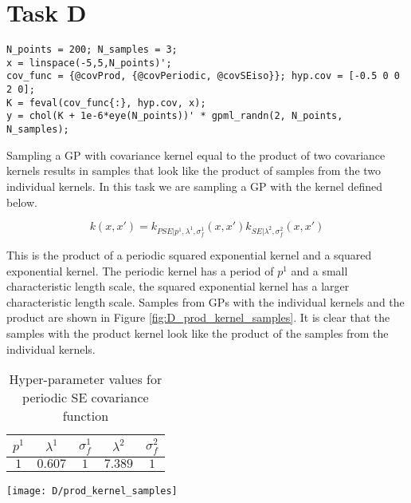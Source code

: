 \documentclass[11pt, twocolumn]{article}
\begin{document}
\section{Task D}

\begin{figure*}[h]
\begin{lstlisting}[caption=Code to sample a GP with covariance defined by the product of a periodic SE kernel and a SE kernel, captionpos=b, basicstyle=\small, frame=tlrb]
N_points = 200; N_samples = 3;
x = linspace(-5,5,N_points)';
cov_func = {@covProd, {@covPeriodic, @covSEiso}}; hyp.cov = [-0.5 0 0 2 0];
K = feval(cov_func{:}, hyp.cov, x);
y = chol(K + 1e-6*eye(N_points))' * gpml_randn(2, N_points, N_samples);
\end{lstlisting}
\label{lst:2D}
\end{figure*}

Sampling a GP with covariance kernel equal to the product of two covariance kernels results in samples that look like the product of samples from the two individual kernels. In this task we are sampling a GP with the kernel defined below.

\[k(x, x') = k_{PSE | p^1, \lambda^1, \sigma_f^1}(x, x')k_{SE | \lambda^2, \sigma_f^2}(x, x')\]

This is the product of a periodic squared exponential kernel and a squared exponential kernel. The periodic kernel has a period of $p^1$ and a small characteristic length scale, the squared exponential kernel has a larger characteristic length scale. Samples from GPs with the individual kernels and the product are shown in Figure \ref{fig:D_prod_kernel_samples}. It is clear that the samples with the product kernel look like the product of the samples from the individual kernels.

\begin{table}[h]
    \centering
    \small
    \begin{tabular}{|c|c|c|c|c|}
        \hline
        $p^1$ & $\lambda^1$ & $\sigma_f^1$ & $\lambda^2$ & $\sigma_f^2$ \\
        \hline
        $1$ & $0.607$ & $1$ & $7.389$ & $1$ \\
        \hline
    \end{tabular}
    \caption{Hyper-parameter values for periodic SE covariance function}
    \label{table:D_product_covariance_hyper_parameters}
\end{table}

\begin{figure*}[h]
    \centering
    \texttt{[image: D/prod\_kernel\_samples]}
    \caption{Samples from 3 covariance kernels, hyper-parameters for each given in Table \ref{table:D_product_covariance_hyper_parameters}}
    \label{fig:D_prod_kernel_samples}
\end{figure*}
\end{document}
